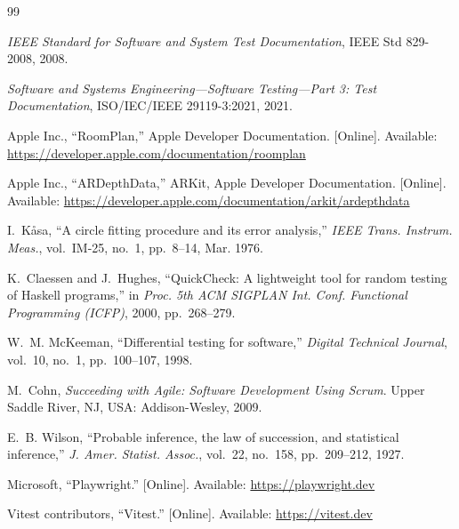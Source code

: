 \documentclass[conference,a4paper,10pt]{IEEEtran}
\begin{document}
\newpage

\begin{thebibliography}{99}

\emph{IEEE Standard for Software and System Test Documentation}, IEEE Std
829-2008, 2008.

\emph{Software and Systems Engineering---Software Testing---Part 3: Test
Documentation}, ISO/IEC/IEEE 29119-3:2021, 2021.

Apple Inc., ``RoomPlan,'' Apple Developer Documentation. [Online]. Available:
\url{https://developer.apple.com/documentation/roomplan}

Apple Inc., ``ARDepthData,'' ARKit, Apple Developer Documentation. [Online].
Available: \url{https://developer.apple.com/documentation/arkit/ardepthdata}

I.~K{\aa}sa, ``A circle fitting procedure and its error analysis,''
\emph{IEEE Trans. Instrum. Meas.}, vol.~IM-25, no.~1, pp.~8--14, Mar. 1976.

K.~Claessen and J.~Hughes, ``QuickCheck: A lightweight tool for random testing
of Haskell programs,'' in \emph{Proc. 5th ACM SIGPLAN Int. Conf. Functional
Programming (ICFP)}, 2000, pp.~268--279.

W.~M. McKeeman, ``Differential testing for software,'' \emph{Digital
Technical Journal}, vol.~10, no.~1, pp.~100--107, 1998.

M.~Cohn, \emph{Succeeding with Agile: Software Development Using Scrum}.
Upper Saddle River, NJ, USA: Addison-Wesley, 2009.

E.~B. Wilson, ``Probable inference, the law of succession, and statistical
inference,'' \emph{J. Amer. Statist. Assoc.}, vol.~22, no.~158,
pp.~209--212, 1927.

Microsoft, ``Playwright.'' [Online]. Available: \url{https://playwright.dev}

Vitest contributors, ``Vitest.'' [Online]. Available:
\url{https://vitest.dev}

\end{thebibliography}
\end{document}
